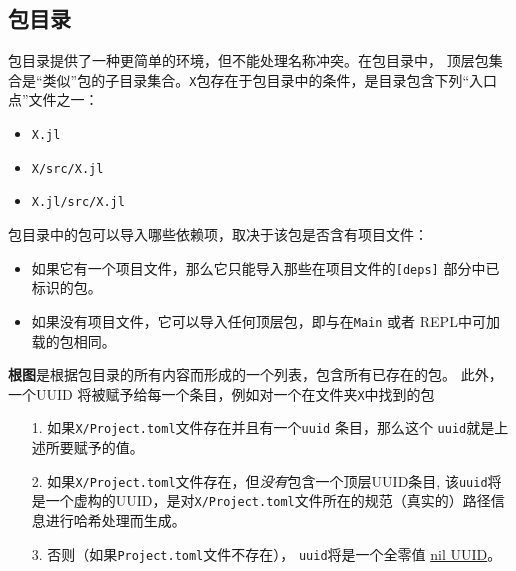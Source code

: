 \hypertarget{9048837682653155362}{}


\subsection{包目录}



包目录提供了一种更简单的环境，但不能处理名称冲突。在包目录中， 顶层包集合是“类似”包的子目录集合。\texttt{X}包存在于包目录中的条件，是目录包含下列“入口点”文件之一：



\begin{itemize}
\item \texttt{X.jl}


\item \texttt{X/src/X.jl}


\item \texttt{X.jl/src/X.jl}

\end{itemize}


包目录中的包可以导入哪些依赖项，取决于该包是否含有项目文件：



\begin{itemize}
\item 如果它有一个项目文件，那么它只能导入那些在项目文件的\texttt{[deps]} 部分中已标识的包。


\item 如果没有项目文件，它可以导入任何顶层包，即与在\texttt{Main} 或者 REPL中可加载的包相同。

\end{itemize}


\textbf{根图}是根据包目录的所有内容而形成的一个列表，包含所有已存在的包。 此外，一个UUID 将被赋予给每一个条目，例如对一个在文件夹\texttt{X}中找到的包



\begin{itemize}
\item[1. ] 如果\texttt{X/Project.toml}文件存在并且有一个\texttt{uuid} 条目，那么这个 \texttt{uuid}就是上述所要赋予的值。


\item[2. ] 如果\texttt{X/Project.toml}文件存在，但\emph{没有}包含一个顶层UUID条目, 该\texttt{uuid}将是一个虚构的UUID，是对\texttt{X/Project.toml}文件所在的规范（真实的）路径信息进行哈希处理而生成。


\item[3. ] 否则（如果\texttt{Project.toml}文件不存在）， \texttt{uuid}将是一个全零值 \href{https://en.wikipedia.org/wiki/Universally\_unique\_identifier\#Nil\_UUID}{nil UUID}。

\end{itemize}


